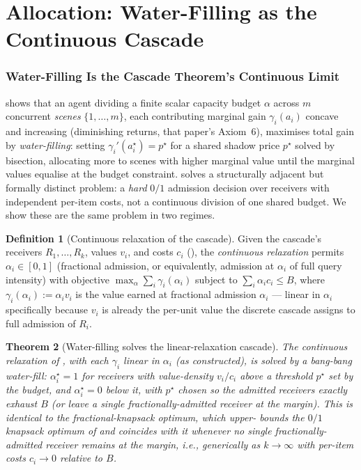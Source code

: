 \documentclass[11pt,twocolumn,a4paper]{article}
\theoremstyle{rdm}
\newtheorem{theorem}{Theorem}[section]
\theoremstyle{definition}
\newtheorem{definition}[theorem]{Definition}
\theoremstyle{remark}
\newcommand{\Rec}{R}
\begin{document}
\part{Allocation: Water-Filling as the Continuous Cascade}
\label{part:allocation}

\section{Water-Filling Is the Cascade Theorem's Continuous Limit}
\label{sec:waterfill}

\citet[Thm.~5.1, Alg.~1]{sachikonye-split-attention} shows that an agent
dividing a finite scalar capacity budget $\alpha$ across $m$ concurrent
\emph{scenes} $\{1,\dots,m\}$, each contributing marginal gain
$\gamma_i(a_i)$ concave and increasing (diminishing returns, that paper's
Axiom~6), maximises total gain by \emph{water-filling}: setting
$\gamma_i'(a_i^\star)=p^\star$ for a shared shadow price $p^\star$ solved by
bisection, allocating more to scenes with higher marginal value until the
marginal values equalise at the budget constraint. 
solves a structurally adjacent but formally distinct problem: a \emph{hard}
$0/1$ admission decision over receivers with independent per-item costs,
not a continuous division of one shared budget. We show these are the same
problem in two regimes.

\begin{definition}[Continuous relaxation of the cascade]
\label{def:continuous-cascade}
Given the cascade's receivers $\Rec_1,\dots,\Rec_k$, values $v_i$, and costs
$c_i$ (), the \emph{continuous relaxation} permits
$\alpha_i\in[0,1]$ (fractional admission, or equivalently, admission at
$\alpha_i$ of full query intensity) with objective
$\max_\alpha\sum_i\gamma_i(\alpha_i)$ subject to $\sum_i\alpha_ic_i\le B$,
where $\gamma_i(\alpha_i):=\alpha_i v_i$ is the value earned at fractional
admission $\alpha_i$ — linear in $\alpha_i$ specifically because $v_i$ is
already the per-unit value the discrete cascade assigns to full admission of
$\Rec_i$.
\end{definition}

\begin{theorem}[Water-filling solves the linear-relaxation cascade]
\label{thm:waterfill-cascade}
The continuous relaxation of , with each
$\gamma_i$ linear in $\alpha_i$ (as constructed), is solved by a
\emph{bang-bang} water-fill: $\alpha_i^\star=1$ for receivers with
value-density $v_i/c_i$ above a threshold $p^\star$ set by the budget, and
$\alpha_i^\star=0$ below it, with $p^\star$ chosen so the admitted receivers
exactly exhaust $B$ (or leave a single fractionally-admitted receiver at the
margin). This is identical to the fractional-knapsack optimum, which upper-
bounds the $0/1$ knapsack optimum of  and coincides
with it whenever no single fractionally-admitted receiver remains at the
margin, i.e., generically as $k\to\infty$ with per-item costs $c_i\to 0$
relative to $B$.
\end{theorem}
\end{document}
